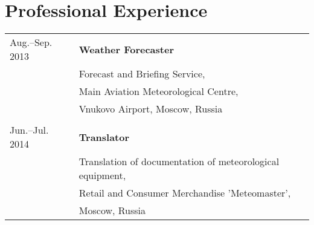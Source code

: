 \documentclass[a4paper,10pt]{article}
\newlength{\mycol}
\begin{document}
\section{Professional Experience}
\begin{tabu} to 
 {\small Aug.--Sep.} 2013 & \textbf{Weather Forecaster} \\
& Forecast and Briefing Service, \\
& Main Aviation Meteorological Centre, \\
& Vnukovo Airport, Moscow, Russia \\
 \\
 {\small Jun.--Jul.} 2014 & \textbf{Translator} \\
& Translation of documentation of meteorological equipment, \\
& Retail and Consumer Merchandise 'Meteomaster', \\
& Moscow, Russia
\end{tabu}
\end{document}
